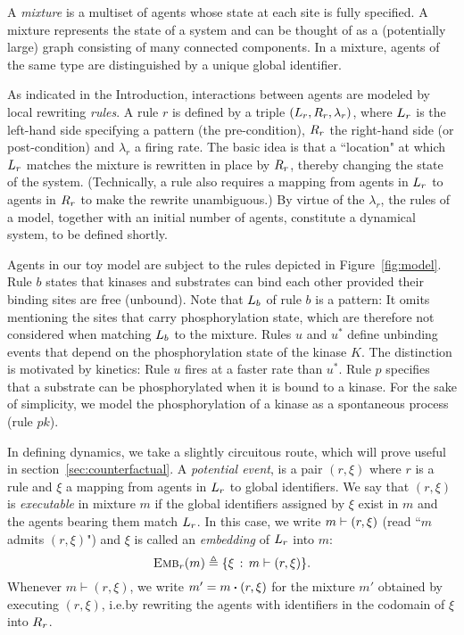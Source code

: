 A \emph{mixture} is a multiset of agents whose state at each site is fully specified. A mixture represents the state of a system and can be thought of as a (potentially large) graph consisting of many connected components. In a mixture, agents of the same type are distinguished by a unique global identifier. 



As indicated in the Introduction, interactions between agents are modeled by local rewriting \emph{rules}.  A rule $r$ is defined by a triple $(L_{r}, R_{r}, \lambda_r)$, where $L_{r}$ is the left-hand side specifying a pattern (the pre-condition), $R_{r}$ the right-hand side (or post-condition) and $\lambda_r$ a firing rate.  The basic idea is that a ``location" at which $L_{r}$ matches the mixture is rewritten in place by $R_{r}$, thereby changing the state of the system. (Technically, a rule also requires a mapping from agents in $L_{r}$ to agents in $R_{r}$ to make the rewrite unambiguous.) By virtue of the $\lambda_r$, the rules of a model, together with an initial number of agents, constitute a dynamical system, to be defined shortly.

Agents in our toy model are subject to the rules depicted in Figure~\ref{fig:model}. Rule $b$ states that kinases and substrates can bind each other provided their binding sites are free (unbound). Note that $L_{b}$ of rule $b$ is a pattern: It omits mentioning the sites that carry phosphorylation state, which are therefore not considered when matching $L_{b}$ to the mixture. Rules $u$ and $u^{*}$ define unbinding events that depend on the phosphorylation state of the kinase $K$. The distinction is motivated by kinetics: Rule $u$ fires at a faster rate than $u^{*}$.  Rule $p$ specifies that a substrate can be phosphorylated when it is bound to a kinase. For the sake of simplicity, we model the phosphorylation of a kinase as a spontaneous process (rule $pk$).



In defining dynamics, we take a slightly circuitous route, which will prove useful in section~\ref{sec:counterfactual}. A \emph{potential event}, is a pair $(r, \xi)$ where $r$ is a rule and $\xi$ a mapping from agents in $L_{r}$ to global identifiers. We say that $(r, \xi)$ is \emph{executable} in mixture $m$ if the global identifiers assigned by $\xi$ exist in $m$ and the agents bearing them match $L_{r}$. In this case, we write $m \vdash (r, \xi)$ (read ``$m$ admits $(r, \xi)$") and $\xi$ is called an \emph{embedding} of $L_{r}$ into $m$: \[{\textsc{Emb}}_{r}(m) \triangleq \{ \xi \,:\, m \vdash (r, \xi)\}.\] Whenever $m \vdash (r, \xi)$, we write $m'=\UPDATE{m}{(r, \xi)}$ for the mixture $m'$ obtained by executing $(r, \xi)$, i.e.\@ by rewriting the agents with identifiers in the codomain of $\xi$ into $R_{r}$.

